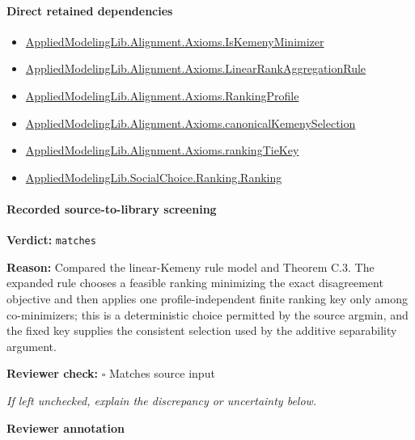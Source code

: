 \documentclass[10pt]{article}
\newcommand{\reviewerbox}{%
  \par\noindent\fbox{\parbox{0.96\linewidth}{\rule{0pt}{0.38in}}}\par
}
\newcommand{\reviewmatch}[1]{%
  \par\noindent\textbf{Reviewer check:} $\square$\; #1\par
  \noindent\emph{If left unchecked, explain the discrepancy or uncertainty below.}\par
}
\begin{document}
\paragraph{Direct retained dependencies}
\begin{itemize}\raggedright
\item \hyperlink{governing-declaration-d5e7d2376e0718c7}{Applied\allowbreak{}Modeling\allowbreak{}Lib.\allowbreak{}Alignment.\allowbreak{}Axioms.\allowbreak{}Is\allowbreak{}Kemeny\allowbreak{}Minimizer}
\item \hyperlink{library-prerequisite-43447e121a1884f9}{Applied\allowbreak{}Modeling\allowbreak{}Lib.\allowbreak{}Alignment.\allowbreak{}Axioms.\allowbreak{}Linear\allowbreak{}Rank\allowbreak{}Aggregation\allowbreak{}Rule}
\item \hyperlink{library-prerequisite-9bded048a60dfe0a}{Applied\allowbreak{}Modeling\allowbreak{}Lib.\allowbreak{}Alignment.\allowbreak{}Axioms.\allowbreak{}Ranking\allowbreak{}Profile}
\item \hyperlink{governing-declaration-a5f4a44d544429bc}{Applied\allowbreak{}Modeling\allowbreak{}Lib.\allowbreak{}Alignment.\allowbreak{}Axioms.\allowbreak{}canonical\allowbreak{}Kemeny\allowbreak{}Selection}
\item \hyperlink{governing-declaration-0d4a2a77c766c09c}{Applied\allowbreak{}Modeling\allowbreak{}Lib.\allowbreak{}Alignment.\allowbreak{}Axioms.\allowbreak{}ranking\allowbreak{}Tie\allowbreak{}Key}
\item \hyperlink{library-prerequisite-5cde54446d1ae021}{Applied\allowbreak{}Modeling\allowbreak{}Lib.\allowbreak{}Social\allowbreak{}Choice.\allowbreak{}Ranking.\allowbreak{}Ranking}
\end{itemize}
\paragraph{Recorded source-to-library screening}
\textbf{Verdict:} \texttt{matches}
\\
{\raggedright
\textbf{Reason:} Compared the linear-\allowbreak{}Kemeny rule model and Theorem C.\allowbreak{}3.\allowbreak{} The expanded rule chooses a feasible ranking minimizing the exact disagreement objective and then applies one profile-\allowbreak{}independent finite ranking key only among co-\allowbreak{}minimizers;\allowbreak{} this is a deterministic choice permitted by the source argmin, and the fixed key supplies the consistent selection used by the additive separability argument.\allowbreak{}
\par}
\reviewmatch{Matches source input}
\noindent\textbf{Reviewer annotation}\par
\reviewerbox
\clearpage
\hypertarget{library-prerequisite-8c57c8838b32b597}{}
\end{document}
